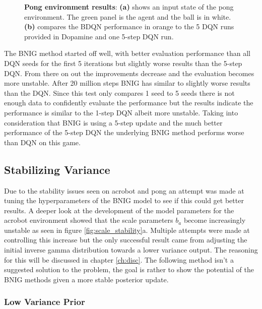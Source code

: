 \begin{figure}[H]
    \caption{\textbf{Pong environment results}: \textbf{(a)} shows an input state of the pong environment\citep{gym_docs}. The green panel is the agent and the ball is in white. \textbf{(b)} compares the BDQN performance in orange to the 5 DQN runs provided in Dopamine and one 5-step DQN run.}
    \label{fig:nn_pong}
\end{figure}

The BNIG method started off well, with better evaluation performance than all DQN seeds for the first 5 iterations but slightly worse results than the 5-step DQN. From there on out the improvements decrease and the evaluation becomes more unstable. After 20 million steps BNIG has similar to slightly worse results than the DQN. Since this test only compares 1 seed to 5 seeds there is not enough data to confidently evaluate the performance but the results indicate the performance is similar to the 1-step DQN albeit more unstable. Taking into consideration that BNIG is using a 5-step update and the much better performance of the 5-step DQN the underlying BNIG method performs worse than DQN on this game.

\subsection{Stabilizing Variance}

Due to the stability issues seen on acrobot and pong an attempt was made at tuning the hyperparameters of the BNIG model to see if this could get better results. A deeper look at the development of the model parameters for the acrobot environment showed that the scale parameters $b_a$ become increasingly unstable as seen in figure \ref{fig:scale_stability}a. Multiple attempts were made at controlling this increase but the only successful result came from adjusting the initial inverse gamma distribution towards a lower variance output. The reasoning for this will be discussed in chapter \ref{ch:disc}. The following method isn't a suggested solution to the problem, the goal is rather to show the potential of the BNIG methods given a more stable posterior update.  %

\subsubsection{Low Variance Prior}

